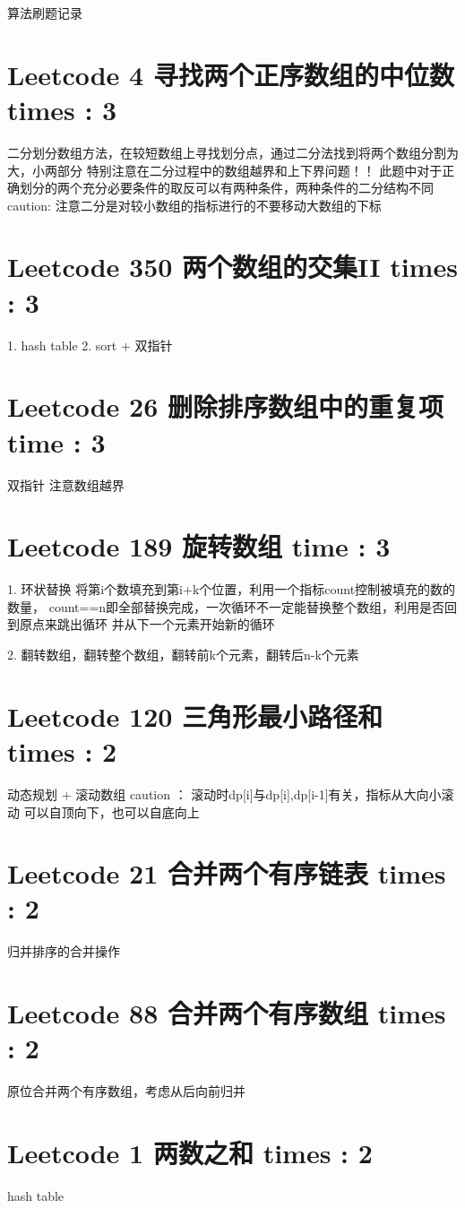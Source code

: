 \documentclass[UTF8]{ctexart}
\begin{document}
算法刷题记录

\section{Leetcode 4 寻找两个正序数组的中位数 times : 3}
二分划分数组方法，在较短数组上寻找划分点，通过二分法找到将两个数组分割为大，小两部分
特别注意在二分过程中的数组越界和上下界问题！！
此题中对于正确划分的两个充分必要条件的取反可以有两种条件，两种条件的二分结构不同
caution: 注意二分是对较小数组的指标进行的不要移动大数组的下标


\section{Leetcode 350 两个数组的交集II times : 3}
1. hash table
2. sort + 双指针

\section{Leetcode 26 删除排序数组中的重复项 time : 3}
双指针
注意数组越界

\section{Leetcode 189 旋转数组 time : 3}
1. 环状替换 将第i个数填充到第i+k个位置，利用一个指标count控制被填充的数的数量，
count==n即全部替换完成，一次循环不一定能替换整个数组，利用是否回到原点来跳出循环
并从下一个元素开始新的循环

2. 翻转数组，翻转整个数组，翻转前k个元素，翻转后n-k个元素

\section{Leetcode 120 三角形最小路径和 times : 2}
动态规划 + 滚动数组
caution ： 滚动时dp[i]与dp[i],dp[i-1]有关，指标从大向小滚动
可以自顶向下，也可以自底向上

\section{Leetcode 21 合并两个有序链表 times : 2}
归并排序的合并操作

\section{Leetcode 88 合并两个有序数组 times : 2}
原位合并两个有序数组，考虑从后向前归并

\section{Leetcode 1 两数之和 times : 2}
hash table
\end{document}
